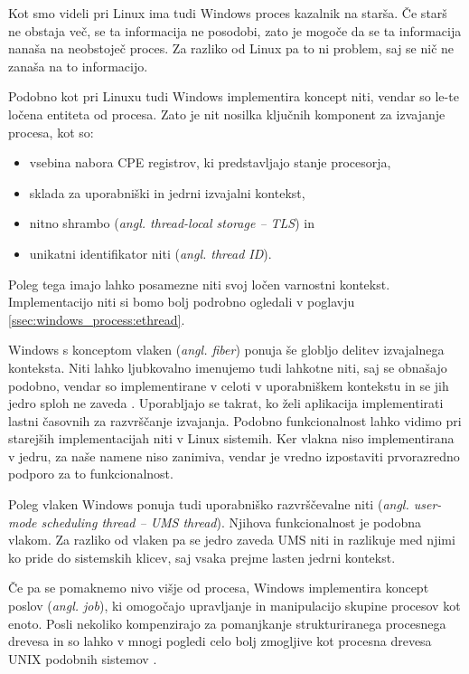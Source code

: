 \documentclass[a4paper,12pt,openright]{book}
\begin{document}
Kot smo videli pri Linux ima tudi Windows proces kazalnik na starša.
Če starš ne obstaja več, se ta informacija ne posodobi, zato je mogoče da se ta informacija nanaša na neobstoječ proces.
Za razliko od Linux pa to ni problem, saj se nič ne zanaša na to informacijo.

Podobno kot pri Linuxu tudi Windows implementira koncept niti, vendar so le-te ločena entiteta od procesa.
Zato je nit nosilka ključnih komponent za izvajanje procesa, kot so:
\begin{itemize}
	\item vsebina nabora CPE registrov, ki predstavljajo stanje procesorja,
	\item sklada za uporabniški in jedrni izvajalni kontekst,
	\item nitno shrambo (\textit{angl. thread-local storage -- TLS}) in
	\item unikatni identifikator niti (\textit{angl. thread ID}).
\end{itemize}
Poleg tega imajo lahko posamezne niti svoj ločen varnostni kontekst.
Implementacijo niti si bomo bolj podrobno ogledali v poglavju \ref{ssec:windows_process:ethread}.

Windows s konceptom vlaken (\textit{angl. fiber}) ponuja še globljo delitev izvajalnega konteksta.
Niti lahko ljubkovalno imenujemo tudi lahkotne niti, saj se obnašajo podobno, vendar so implementirane v celoti v uporabniškem kontekstu in se jih jedro sploh ne zaveda \cite{Yosifovich_Russinovich_Solomon_Ionescu_2017}.
Uporabljajo se takrat, ko želi aplikacija implementirati lastni časovnih za razvrščanje izvajanja.
Podobno funkcionalnost lahko vidimo pri starejših implementacijah niti v Linux sistemih.
Ker vlakna niso implementirana v jedru, za naše namene niso zanimiva, vendar je vredno izpostaviti prvorazredno podporo za to funkcionalnost.

Poleg vlaken Windows ponuja tudi uporabniško razvrščevalne niti (\textit{angl. user-mode scheduling thread -- UMS thread}).
Njihova funkcionalnost je podobna vlakom.
Za razliko od vlaken pa se jedro zaveda UMS niti in razlikuje med njimi ko pride do sistemskih klicev, saj vsaka prejme lasten jedrni kontekst.

Če pa se pomaknemo nivo višje od procesa, Windows implementira koncept poslov (\textit{angl. job}), ki omogočajo upravljanje in manipulacijo skupine procesov kot enoto.
Posli nekoliko kompenzirajo za pomanjkanje strukturiranega procesnega drevesa in so lahko v mnogi pogledi celo bolj zmogljive kot procesna drevesa UNIX podobnih sistemov \cite{Yosifovich_Russinovich_Solomon_Ionescu_2017}.
\end{document}
